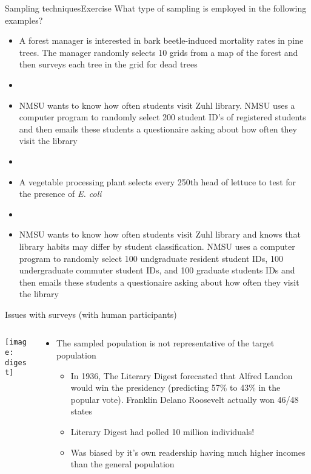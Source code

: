 \documentclass[xcolor=dvipsnames]{beamer}
\begin{document}
\begin{frame}{Sampling techniques}{Exercise}
What type of sampling is employed in the following examples? \pause

{\scriptsize
	\begin{itemize}
		\item A forest manager is interested in bark beetle-induced mortality rates in pine trees. The manager randomly selects 10 grids from a map of the forest and then surveys each tree in the grid for dead trees
		\item[]
		\item NMSU wants to know how often students visit Zuhl library. NMSU uses a computer program to randomly select 200 student ID's of registered students and then emails these students a questionaire asking about how often they visit the library
		\item[]
		\item A vegetable processing plant selects every 250th head of lettuce to test for the presence of \emph{E. coli}
		\item[]
		\item NMSU wants to know how often students visit Zuhl library and knows that library habits may differ by student classification. NMSU uses a computer program to randomly select 100 undgraduate resident student IDs, 100 undergraduate commuter student IDs, and 100 graduate students IDs and then emails these students a questionaire asking about how often they visit the library

	\end{itemize}
}
\end{frame}

\begin{frame}{Issues with surveys (with human participants)}
	\begin{columns}
		\begin{column}{.4 \textwidth}
			\texttt{[image: digest]}
		\end{column}
		\begin{column}{.55 \textwidth}
			\begin{itemize}
				\item The sampled population is not representative of the target population \pause
				
				\begin{itemize}
					\item In 1936, The Literary Digest forecasted that Alfred Landon would win the presidency (predicting 57\% to 43\% in the popular vote). Franklin Delano Roosevelt actually won 46/48 states \pause
					\item Literary Digest had polled 10 million individuals! \pause
					\item Was biased by it's own readership having much higher incomes than the general population
				\end{itemize}
			\end{itemize}

		\end{column}
	\end{columns}
		
\end{frame}
\end{document}
